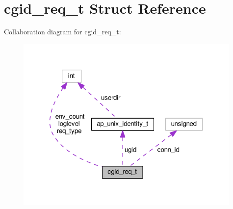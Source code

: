 \hypertarget{structcgid__req__t}{}\section{cgid\+\_\+req\+\_\+t Struct Reference}
\label{structcgid__req__t}


Collaboration diagram for cgid\+\_\+req\+\_\+t\+:
\nopagebreak
\begin{figure}[H]
\begin{center}
\leavevmode
\includegraphics[width=314pt]{structcgid__req__t__coll__graph}
\end{center}
\end{figure}
